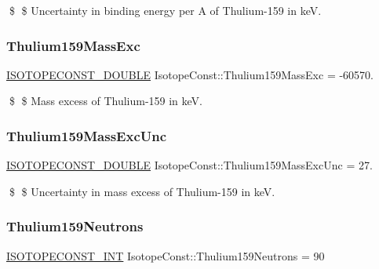 \$ \$ Uncertainty in binding energy per A of Thulium-\/159 in keV. \mbox{\label{group___isotope_const-_thulium-_tm159_ga596f5bed38df5ea7aaa0f64f402c1ef7}} 
\subsubsection{\texorpdfstring{Thulium159\+Mass\+Exc}{Thulium159MassExc}}
{\footnotesize\ttfamily \mbox{\hyperlink{group___isotope_const-_macros_ga8f45a7272ce02c0b4c65c44636ed719a}{I\+S\+O\+T\+O\+P\+E\+C\+O\+N\+S\+T\+\_\+\+D\+O\+U\+B\+LE}} Isotope\+Const\+::\+Thulium159\+Mass\+Exc = -\/60570.}

\$ \$ Mass excess of Thulium-\/159 in keV. \mbox{\label{group___isotope_const-_thulium-_tm159_gab3393897b8b2bec63fad7d4a5abdc4e6}} 
\subsubsection{\texorpdfstring{Thulium159\+Mass\+Exc\+Unc}{Thulium159MassExcUnc}}
{\footnotesize\ttfamily \mbox{\hyperlink{group___isotope_const-_macros_ga8f45a7272ce02c0b4c65c44636ed719a}{I\+S\+O\+T\+O\+P\+E\+C\+O\+N\+S\+T\+\_\+\+D\+O\+U\+B\+LE}} Isotope\+Const\+::\+Thulium159\+Mass\+Exc\+Unc = 27.}

\$ \$ Uncertainty in mass excess of Thulium-\/159 in keV. \mbox{\label{group___isotope_const-_thulium-_tm159_ga5a1469f02709988f9b11b872daa8f2e6}} 
\subsubsection{\texorpdfstring{Thulium159\+Neutrons}{Thulium159Neutrons}}
{\footnotesize\ttfamily \mbox{\hyperlink{group___isotope_const-_macros_ga5f18360b3e99483a35c32d789e62621c}{I\+S\+O\+T\+O\+P\+E\+C\+O\+N\+S\+T\+\_\+\+I\+NT}} Isotope\+Const\+::\+Thulium159\+Neutrons = 90}

